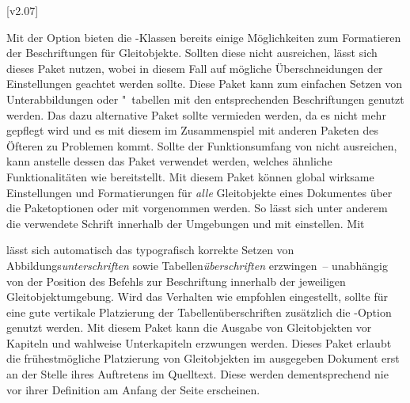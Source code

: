 [v2.07]
%
%
\begin{DeclarePackages}
  Mit der Option  bieten die 
  \KOMAScript-Klassen bereits einige Möglichkeiten zum Formatieren der 
  Beschriftungen für Gleitobjekte. Sollten diese nicht ausreichen, lässt sich 
  dieses Paket nutzen, wobei in diesem Fall auf mögliche Überschneidungen der 
  Einstellungen geachtet werden sollte.
  Diese Paket kann zum einfachen Setzen von Unterabbildungen oder "~tabellen 
  mit den entsprechenden Beschriftungen genutzt werden. Das dazu alternative 
  Paket  sollte vermieden werden, da es nicht mehr gepflegt 
  wird und es mit diesem im Zusammenspiel mit anderen Paketen des Öfteren zu 
  Problemen kommt. Sollte der Funktionsumfang von  nicht 
  ausreichen, kann anstelle dessen das Paket  verwendet 
  werden, welches ähnliche Funktionalitäten wie  bereitstellt.
  Mit diesem Paket können global wirksame Einstellungen und Formatierungen für 
  \emph{alle} Gleitobjekte eines Dokumentes über die Paketoptionen oder mit 
   vorgenommen werden. So lässt sich unter 
  anderem die verwendete Schrift innerhalb der Umgebungen  
  und  mit  
  einstellen. Mit 
  \begin{Code}
  \end{Code}\vspace{-\baselineskip}%
  lässt sich automatisch das typografisch korrekte Setzen von 
  Abbildungs\emph{unterschriften} sowie Tabellen\emph{überschriften} 
  erzwingen~-- unabhängig von der Position des Befehls zur Beschriftung 
   innerhalb der jeweiligen Gleitobjektumgebung. Wird das 
  Verhalten wie empfohlen eingestellt, sollte für eine gute vertikale 
  Platzierung der Tabellenüberschriften zusätzlich die \KOMAScript-Option 
   genutzt werden.
  Mit diesem Paket kann die Ausgabe von Gleitobjekten vor Kapiteln und wahlweise
  Unterkapiteln erzwungen werden.
  Dieses Paket erlaubt die frühestmögliche Platzierung von Gleitobjekten im 
  ausgegeben Dokument erst an der Stelle ihres Auftretens im Quelltext. Diese 
  werden dementsprechend nie vor ihrer Definition am Anfang der Seite 
  erscheinen.
\end{DeclarePackages}
%



